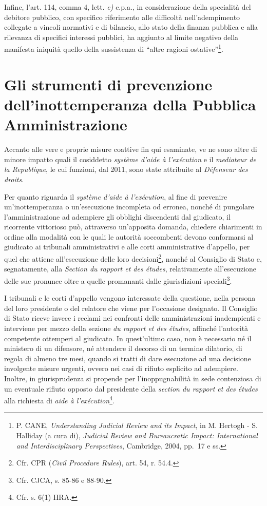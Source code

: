 \documentclass[12pt,it,a4paper,]{report}
\begin{document}
Infine, l'art. 114, comma 4, lett. \emph{e)} c.p.a., in considerazione
della specialità del debitore pubblico, con specifico riferimento alle
difficoltà nell'adempimento collegate a vincoli normativi e di bilancio,
allo stato della finanza pubblica e alla rilevanza di specifici
interessi pubblici, ha aggiunto al limite negativo della manifesta
iniquità quello della sussistenza di ``altre ragioni
ostative''\footnote{P. CANE, \emph{Understanding Judicial Review and its
  Impact}, in M. Hertogh - S. Halliday (a cura di), \emph{Judicial
  Review and Bureaucratic Impact: International and Interdisciplinary
  Perspectives}, Cambridge, 2004, pp.~17 e ss.}.

\hypertarget{gli-strumenti-di-prevenzione-dellinottemperanza-della-pubblica-amministrazione}{%
\section{Gli strumenti di prevenzione dell'inottemperanza della Pubblica
Amministrazione}\label{gli-strumenti-di-prevenzione-dellinottemperanza-della-pubblica-amministrazione}}

Accanto alle vere e proprie misure coattive fin qui esaminate, ve ne
sono altre di minore impatto quali il cosiddetto \emph{système d'aide à
l'exécution} e il \emph{mediateur de la Republique}, le cui funzioni,
dal 2011, sono state attribuite al \emph{Défenseur des droits}.

Per quanto riguarda il \emph{système d'aide à l'exécution}, al fine di
prevenire un'inottemperanza o un'esecuzione incompleta od erronea,
nonché di pungolare l'amministrazione ad adempiere gli obblighi
discendenti dal giudicato, il ricorrente vittorioso può, attraverso
un'apposita domanda, chiedere chiarimenti in ordine alla modalità con le
quali le autorità soccombenti devono conformarsi al giudicato ai
tribunali amministrativi e alle corti amministrative d'appello, per quel
che attiene all'esecuzione delle loro decisioni\footnote{Cfr. CPR
  (\emph{Civil Procedure Rules}), art. 54, r. 54.4.}, nonché al
Consiglio di Stato e, segnatamente, alla \emph{Section du rapport et des
études}, relativamente all'esecuzione delle sue pronunce oltre a quelle
promananti dalle giurisdizioni speciali\footnote{Cfr. CJCA, s. 85-86 e
  88-90.}.

I tribunali e le corti d'appello vengono interessate della questione,
nella persona del loro presidente o del relatore che viene per
l'occasione designato. Il Consiglio di Stato riceve invece i reclami nei
confronti delle amministrazioni inadempienti e interviene per mezzo
della sezione \emph{du rapport et des études}, affinché l'autorità
competente ottemperi al giudicato. In quest'ultimo caso, non è
necessario né il ministero di un difensore, né attendere il decorso di
un termine dilatorio, di regola di almeno tre mesi, quando si tratti di
dare esecuzione ad una decisione involgente misure urgenti, ovvero nei
casi di rifiuto esplicito ad adempiere. Inoltre, in giurisprudenza si
propende per l'inoppugnabilità in sede contenziosa di un eventuale
rifiuto opposto dal presidente della \emph{section du rapport et des
études} alla richiesta di \emph{aide à l'exécution}\footnote{Cfr. s.
  6(1) HRA.}.
\end{document}
